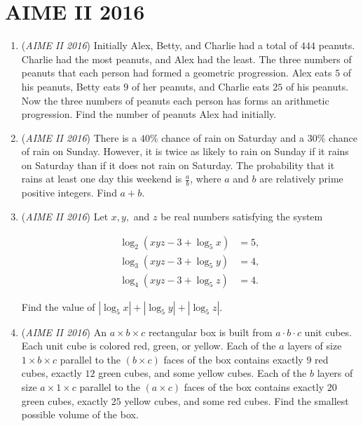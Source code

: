 \section{AIME II 2016}
        \begin{enumerate}
        	\item (\textit{AIME II 2016}) Initially Alex, Betty, and Charlie had a total of $444$ peanuts. Charlie had the most peanuts, and Alex had the least. The three numbers of peanuts that each person had formed a geometric progression. Alex eats $5$ of his peanuts, Betty eats $9$ of her peanuts, and Charlie eats $25$ of his peanuts. Now the three numbers of peanuts each person has forms an arithmetic progression. Find the number of peanuts Alex had initially.


 

	\item (\textit{AIME II 2016}) There is a $40\%$ chance of rain on Saturday and a $30\%$ chance of rain on Sunday. However, it is twice as likely to rain on Sunday if it rains on Saturday than if it does not rain on Saturday. The probability that it rains at least one day this weekend is $\frac{a}{b}$, where $a$ and $b$ are relatively prime positive integers. Find $a+b$.


 

	\item (\textit{AIME II 2016}) Let $x,y,$ and $z$ be real numbers satisfying the system

 \begin{align*} \log_2(xyz-3+\log_5 x)&=5,\\ \log_3(xyz-3+\log_5 y)&=4,\\ \log_4(xyz-3+\log_5 z)&=4. \end{align*}

Find the value of $|\log_5 x|+|\log_5 y|+|\log_5 z|$.


 

	\item (\textit{AIME II 2016}) An $a \times b \times c$ rectangular box is built from $a \cdot b \cdot c$ unit cubes. Each unit cube is colored red, green, or yellow. Each of the $a$ layers of size $1 \times b \times c$ parallel to the $(b \times c)$ faces of the box contains exactly $9$ red cubes, exactly $12$ green cubes, and some yellow cubes. Each of the $b$ layers of size $a \times 1 \times c$ parallel to the $(a \times c)$ faces of the box contains exactly $20$ green cubes, exactly $25$ yellow cubes, and some red cubes. Find the smallest possible volume of the box.



\end{enumerate}
